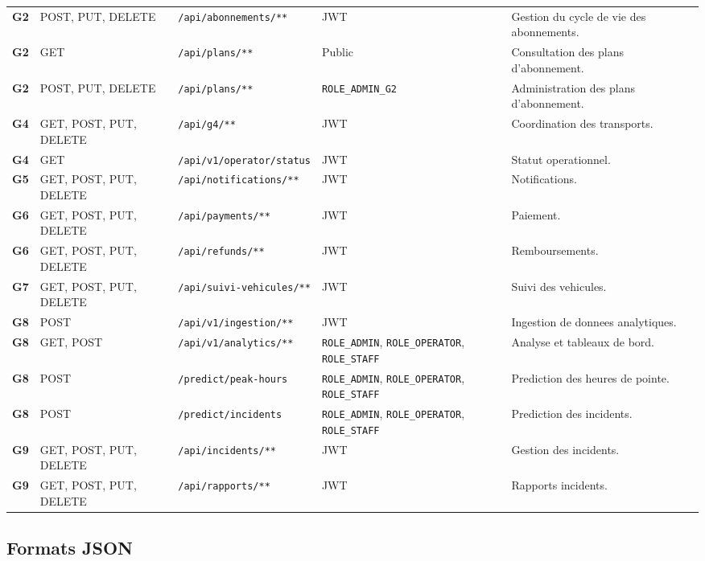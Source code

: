 \documentclass[12pt, a4paper]{article}
\begin{document}
\begin{center}
\begin{longtable}{>{\bfseries}p{1.7cm} p{2.2cm} p{4.3cm} p{3cm} p{3.4cm}}
G2 & POST, PUT, DELETE & \texttt{/api/abonnements/**} & JWT & Gestion du cycle de vie des abonnements. \\
\rowcolor{lightgray}
G2 & GET & \texttt{/api/plans/**} & Public & Consultation des plans d'abonnement. \\
G2 & POST, PUT, DELETE & \texttt{/api/plans/**} & \texttt{ROLE\_ADMIN\_G2} & Administration des plans d'abonnement. \\
\rowcolor{lightgray}
G4 & GET, POST, PUT, DELETE & \texttt{/api/g4/**} & JWT & Coordination des transports. \\
G4 & GET & \texttt{/api/v1/operator/status} & JWT & Statut operationnel. \\
\rowcolor{lightgray}
G5 & GET, POST, PUT, DELETE & \texttt{/api/notifications/**} & JWT & Notifications. \\
G6 & GET, POST, PUT, DELETE & \texttt{/api/payments/**} & JWT & Paiement. \\
\rowcolor{lightgray}
G6 & GET, POST, PUT, DELETE & \texttt{/api/refunds/**} & JWT & Remboursements. \\
G7 & GET, POST, PUT, DELETE & \texttt{/api/suivi-vehicules/**} & JWT & Suivi des vehicules. \\
\rowcolor{lightgray}
G8 & POST & \texttt{/api/v1/ingestion/**} & JWT & Ingestion de donnees analytiques. \\
G8 & GET, POST & \texttt{/api/v1/analytics/**} & \texttt{ROLE\_ADMIN}, \texttt{ROLE\_OPERATOR}, \texttt{ROLE\_STAFF} & Analyse et tableaux de bord. \\
\rowcolor{lightgray}
G8 & POST & \texttt{/predict/peak-hours} & \texttt{ROLE\_ADMIN}, \texttt{ROLE\_OPERATOR}, \texttt{ROLE\_STAFF} & Prediction des heures de pointe. \\
G8 & POST & \texttt{/predict/incidents} & \texttt{ROLE\_ADMIN}, \texttt{ROLE\_OPERATOR}, \texttt{ROLE\_STAFF} & Prediction des incidents. \\
\rowcolor{lightgray}
G9 & GET, POST, PUT, DELETE & \texttt{/api/incidents/**} & JWT & Gestion des incidents. \\
G9 & GET, POST, PUT, DELETE & \texttt{/api/rapports/**} & JWT & Rapports incidents. \\
\end{longtable}
\end{center}

\subsection{Formats JSON}
\end{document}
